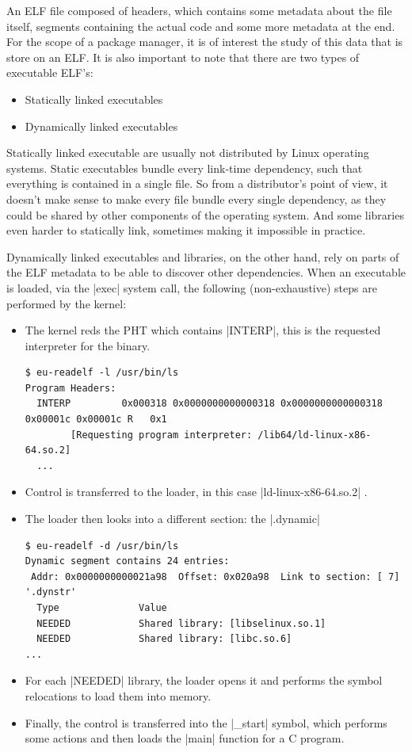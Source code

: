 An ELF file composed of headers, which contains some
metadata about the file itself, segments containing the
actual code and some more metadata at the end. For the scope
of a package manager, it is of interest the study of this
data that is store on an ELF. It is also important to note
that there are two types of executable ELF's:

\begin{itemize}
    \item Statically linked executables
    \item Dynamically linked executables
\end{itemize}

Statically linked executable are usually not distributed by
Linux operating systems. Static executables bundle every
link-time dependency, such that everything is contained in a
single file. So from a distributor's point of view, it
doesn't make sense to make every file bundle every single
dependency, as they could be shared by other components of
the operating system. And some libraries even harder to
statically link, sometimes making it impossible in practice.

Dynamically linked executables and libraries, on the other
hand, rely on parts of the ELF metadata to be able to
discover other dependencies. When an executable is loaded,
via the |exec| system call, the following (non-exhaustive) steps are
performed by the kernel:

\begin{itemize}
    \item The kernel reds the \acl{PHT} which contains
    |INTERP|, this is the requested interpreter for the
    binary.
    \begin{verbatim}
$ eu-readelf -l /usr/bin/ls
Program Headers:
  INTERP         0x000318 0x0000000000000318 0x0000000000000318 0x00001c 0x00001c R   0x1
        [Requesting program interpreter: /lib64/ld-linux-x86-64.so.2]
  ...
    \end{verbatim}
    \item Control is transferred to the loader, in this case
    |ld-linux-x86-64.so.2| .
    \item The loader then looks into a different section:
    the |.dynamic|
    \begin{verbatim}
$ eu-readelf -d /usr/bin/ls
Dynamic segment contains 24 entries:
 Addr: 0x0000000000021a98  Offset: 0x020a98  Link to section: [ 7] '.dynstr'
  Type              Value
  NEEDED            Shared library: [libselinux.so.1]
  NEEDED            Shared library: [libc.so.6]
...
\end{verbatim}
    \item For each |NEEDED| library, the loader opens it and
    performs the symbol relocations to load them into
    memory.
    \item Finally, the control is transferred into the
    |_start| symbol, which performs some actions and then
    loads the |main| function for a C program.
\end{itemize}

